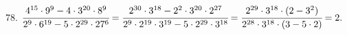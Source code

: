 78. $\cfrac{4^{15}\cdot9^9-4\cdot3^{20}\cdot8^9}{2^9\cdot6^{19}-5\cdot2^{29}\cdot27^6}=
\cfrac{2^{30}\cdot3^{18}-2^2\cdot3^{20}\cdot2^{27}}{2^9\cdot2^{19}\cdot3^{19}-5\cdot2^{29}\cdot3^{18}}=
\cfrac{2^{29}\cdot3^{18}\cdot(2-3^2)}{2^{28}\cdot3^{18}\cdot(3-5\cdot2)}=2.$\\
